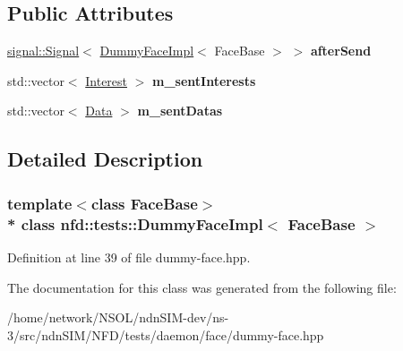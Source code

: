 \subsection*{Public Attributes}
\begin{DoxyCompactItemize}
\item 
\hyperlink{classndn_1_1util_1_1signal_1_1Signal}{signal\+::\+Signal}$<$ \hyperlink{classnfd_1_1tests_1_1DummyFaceImpl}{Dummy\+Face\+Impl}$<$ Face\+Base $>$ $>$ {\bfseries after\+Send}\hypertarget{classnfd_1_1tests_1_1DummyFaceImpl_a41a7da1c4dbbdc4b1a18842d997f2383}{}\label{classnfd_1_1tests_1_1DummyFaceImpl_a41a7da1c4dbbdc4b1a18842d997f2383}

\item 
std\+::vector$<$ \hyperlink{classndn_1_1Interest}{Interest} $>$ {\bfseries m\+\_\+sent\+Interests}\hypertarget{classnfd_1_1tests_1_1DummyFaceImpl_a0ce17086e5649053aede1c6e7a1a9326}{}\label{classnfd_1_1tests_1_1DummyFaceImpl_a0ce17086e5649053aede1c6e7a1a9326}

\item 
std\+::vector$<$ \hyperlink{classndn_1_1Data}{Data} $>$ {\bfseries m\+\_\+sent\+Datas}\hypertarget{classnfd_1_1tests_1_1DummyFaceImpl_a253ca8812cb6fcee3fc208d12a538404}{}\label{classnfd_1_1tests_1_1DummyFaceImpl_a253ca8812cb6fcee3fc208d12a538404}

\end{DoxyCompactItemize}


\subsection{Detailed Description}
\subsubsection*{template$<$class Face\+Base$>$\\*
class nfd\+::tests\+::\+Dummy\+Face\+Impl$<$ Face\+Base $>$}



Definition at line 39 of file dummy-\/face.\+hpp.



The documentation for this class was generated from the following file\+:\begin{DoxyCompactItemize}
\item 
/home/network/\+N\+S\+O\+L/ndn\+S\+I\+M-\/dev/ns-\/3/src/ndn\+S\+I\+M/\+N\+F\+D/tests/daemon/face/dummy-\/face.\+hpp\end{DoxyCompactItemize}
